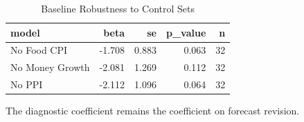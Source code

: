 \begin{table}[!htbp]
\centering
\caption{Baseline Robustness to Control Sets}
\label{tab:ols_robustness}
\begin{threeparttable}

\begin{tabular}{lrrrr}
\toprule
model & beta & se & p\_value & n\\
\midrule
No Food CPI & -1.708 & 0.883 & 0.063 & 32\\
No Money Growth & -2.081 & 1.269 & 0.112 & 32\\
No PPI & -2.112 & 1.096 & 0.064 & 32\\
\bottomrule
\end{tabular}
\begin{tablenotes}[flushleft]
\footnotesize
\item The diagnostic coefficient remains the coefficient on forecast revision.
\end{tablenotes}
\end{threeparttable}
\end{table}
